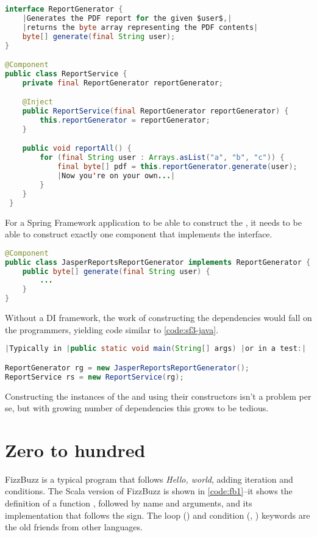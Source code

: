 \documentclass[10 pt]{article}
\begin{document}
\begin{lstlisting}[caption={Components}, label={code:sf1-java}, language=Java, escapechar=|]
interface ReportGenerator {
    |Generates the PDF report for the given $user$,|
    |returns the byte array representing the PDF contents|
    byte[] generate(final String user);
}

@Component
public class ReportService {
    private final ReportGenerator reportGenerator;

    @Inject
    public ReportService(final ReportGenerator reportGenerator) {
        this.reportGenerator = reportGenerator;
    }

    public void reportAll() {
        for (final String user : Arrays.asList("a", "b", "c")) {
            final byte[] pdf = this.reportGenerator.generate(user);
            |Now you're on your own...|
        }
    }
 }
\end{lstlisting}

For a Spring Framework application to be able to construct the , it needs to be able to construct exactly one component that implements the  interface.

\begin{lstlisting}[caption={Components}, label={code:sf2-java}, language=Java, escapechar=|]
@Component
public class JasperReportsReportGenerator implements ReportGenerator {
    public byte[] generate(final String user) {
        ...
    }
}
\end{lstlisting}

Without a DI framework, the work of constructing the dependencies would fall on the programmers, yielding code similar to \autoref{code:sf3-java}.

\begin{lstlisting}[caption={Manual DI}, label={code:sf3-java}, language=Java, escapechar=|]
|Typically in |public static void main(String[] args) |or in a test:|

ReportGenerator rg = new JasperReportsReportGenerator();
ReportService rs = new ReportService(rg);
\end{lstlisting}

Constructing the instances of the  and  using their constructors isn't a problem per se, but with growing number of dependencies this grows to be tedious.


\section{Zero to hundred}
FizzBuzz is a typical program that follows \emph{Hello, world}, adding iteration and conditions. The Scala version of FizzBuzz is shown in \autoref{code:fb1}--it shows the definition of a function , followed by name and arguments, and its implementation that follows the \pcode{=} sign. The loop () and condition (, ) keywords are the old friends from other languages. 
\end{document}
